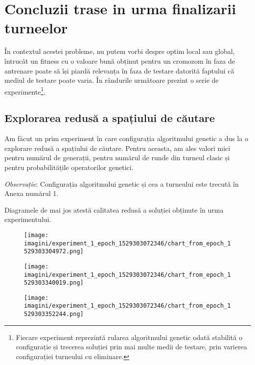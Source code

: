 \section {Concluzii trase in urma finalizarii turneelor}

În contextul acestei probleme, nu putem vorbi despre optim local sau global, întrucât un fitness cu o valoare bună obținut pentru un cromozom în faza de antrenare poate să își piardă relevanța în faza de testare datorită faptului că mediul de testare poate varia. În rândurile următoare prezint o serie de experimente\footnote{Fiecare experiment reprezintă rularea algoritmului genetic odată stabilită o configurație și trecerea soluției prin mai multe medii de testare, prin varierea configurației turneului cu eliminare.}.  

\subsection {Explorarea redusă a spațiului de căutare}  

Am făcut un prim experiment în care configurația algoritmului genetic a dus la o explorare redusă a spațiului de căutare. Pentru aceasta, am ales valori mici pentru numărul de generații, pentru numărul de runde din turneul clasic și pentru probabilitățile operatorilor genetici.
 
\textit{Observație}: Configurația algoritmului genetic și cea a turneului este trecută în Anexa numărul 1.

Diagramele de mai jos atestă calitatea redusă a soluției obținute în urma experimentului. 

\begin{figure}[H]
	\centering
	\texttt{[image: imagini/experiment\_1\_epoch\_1529303072346/chart\_from\_epoch\_1529303304972.png]}
\end{figure}

\begin{figure}[H]
	\centering
	\texttt{[image: imagini/experiment\_1\_epoch\_1529303072346/chart\_from\_epoch\_1529303340019.png]}
\end{figure}

\begin{figure}[H]
	\centering
	\texttt{[image: imagini/experiment\_1\_epoch\_1529303072346/chart\_from\_epoch\_1529303352244.png]}
\end{figure}

